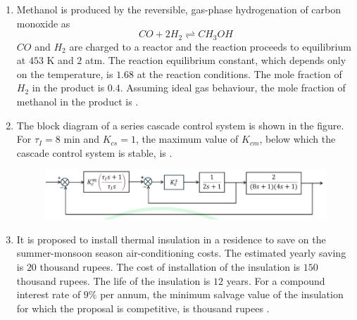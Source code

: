 \documentclass[journal,12pt,onecolumn]{IEEEtran}
\theoremstyle{remark}
\begin{document}
\begin{enumerate}
		\hfill{}
		
		\item Methanol is produced by the reversible, gas-phase hydrogenation of carbon monoxide as
		\[ CO + 2H_2 \rightleftharpoons CH_3OH \]
		$CO$ and $H_2$ are charged to a reactor and the reaction proceeds to equilibrium at $453$ K and $2$ atm. The reaction equilibrium constant, which depends only on the temperature, is $1.68$ at the reaction conditions. The mole fraction of $H_2$ in the product is $0.4$. Assuming ideal gas behaviour, the mole fraction of methanol in the product is \underline{\hspace{2cm}} .
		
		\hfill{}
		
		\item The block diagram of a series cascade control system  is shown in the figure. For $\tau_I = 8$ min and $K_{cs} = 1$, the maximum value of $K_{cm}$, below which the cascade control system is stable, is \underline{\hspace{2cm}} .
		\begin{figure}[h]
			\centering
			\includegraphics[width=0.6\columnwidth]{q62.png}
			\caption*{}
			\label{fig:q62}
		\end{figure}
		\hfill{}
		
		\item It is proposed to install thermal insulation in a residence to save on the summer-monsoon season air-conditioning costs. The estimated yearly saving is $20$ thousand rupees. The cost of installation of the insulation is $150$ thousand rupees. The life of the insulation is $12$ years. For a compound interest rate of $9\%$ per annum, the minimum salvage value of the insulation for which the proposal is competitive, is \underline{\hspace{2cm}} thousand rupees .
		
		\hfill{}
		

\end{enumerate}
\end{document}
